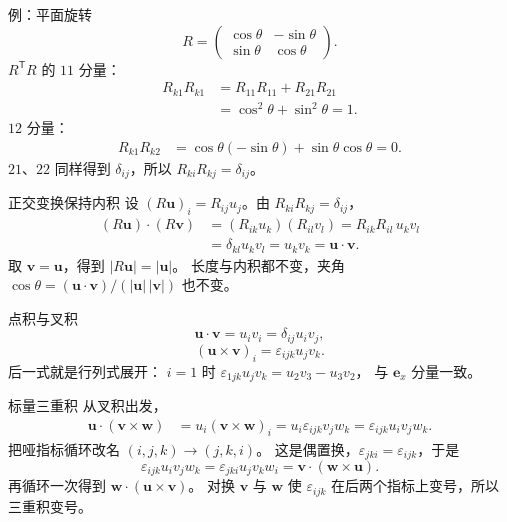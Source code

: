 \documentclass[fontset=windows, chinese, 10pt, xcolor=dvipsnames]{beamer}
\begin{document}
\begin{frame}{例：平面旋转}
  \begin{equation*}
    R=
    \begin{pmatrix}
      \cos\theta & -\sin\theta \\
      \sin\theta & \cos\theta
    \end{pmatrix}.
  \end{equation*}
  $R^{\mathsf T}R$ 的 $11$ 分量：
  \begin{align*}
    R_{k1}R_{k1}
    &= R_{11}R_{11}+R_{21}R_{21} \\
    &= \cos^2\theta+\sin^2\theta
     = 1.
  \end{align*}
  $12$ 分量：
  \begin{align*}
    R_{k1}R_{k2}
    &= \cos\theta(-\sin\theta)+\sin\theta\cos\theta
     = 0.
  \end{align*}
  $21$、$22$ 同样得到 $\delta_{ij}$，所以 $R_{ki}R_{kj}=\delta_{ij}$。
\end{frame}

\begin{frame}{正交变换保持内积}
  设 $(R\mathbf{u})_i=R_{ij}u_j$。由 $R_{ki}R_{kj}=\delta_{ij}$，
  \begin{align*}
    (R\mathbf{u})\cdot(R\mathbf{v})
    &= (R_{ik}u_k)(R_{il}v_l)
     = R_{ik}R_{il}\, u_k v_l \\
    &= \delta_{kl}u_k v_l
     = u_k v_k
     = \mathbf{u}\cdot\mathbf{v}.
  \end{align*}
  取 $\mathbf{v}=\mathbf{u}$，得到 $|R\mathbf{u}|=|\mathbf{u}|$。
  长度与内积都不变，夹角
  $\cos\theta=(\mathbf{u}\cdot\mathbf{v})/(|\mathbf{u}|\,|\mathbf{v}|)$
  也不变。
\end{frame}

\begin{frame}{点积与叉积}
  \begin{equation*}
    \mathbf{u}\cdot\mathbf{v}
    =u_i v_i
    =\delta_{ij}u_i v_j,
  \end{equation*}
  \begin{equation*}
    (\mathbf{u}\times\mathbf{v})_i
    =\varepsilon_{ijk}u_j v_k.
  \end{equation*}
  后一式就是行列式展开：
  $i=1$ 时 $\varepsilon_{1jk}u_j v_k=u_2 v_3-u_3 v_2$，
  与 $\mathbf{e}_x$ 分量一致。
\end{frame}

\begin{frame}{标量三重积}
  从叉积出发，
  \begin{align*}
    \mathbf{u}\cdot(\mathbf{v}\times\mathbf{w})
    &= u_i(\mathbf{v}\times\mathbf{w})_i
     = u_i\varepsilon_{ijk}v_j w_k
     = \varepsilon_{ijk}u_i v_j w_k.
  \end{align*}
  把哑指标循环改名 $(i,j,k)\to(j,k,i)$。
  这是偶置换，$\varepsilon_{jki}=\varepsilon_{ijk}$，于是
  \begin{equation*}
    \varepsilon_{ijk}u_i v_j w_k
    =\varepsilon_{jki}u_j v_k w_i
    =\mathbf{v}\cdot(\mathbf{w}\times\mathbf{u}).
  \end{equation*}
  再循环一次得到 $\mathbf{w}\cdot(\mathbf{u}\times\mathbf{v})$。
  对换 $\mathbf{v}$ 与 $\mathbf{w}$ 使 $\varepsilon_{ijk}$ 在后两个指标上变号，所以三重积变号。
\end{frame}
\end{document}
